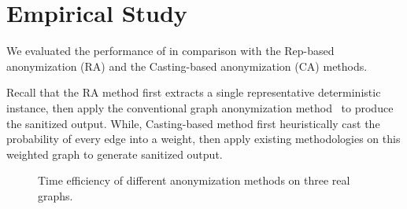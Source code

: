 \section{Empirical Study}
\label{sec:ex}
We evaluated the performance of {\methodName} in comparison with the Rep-based anonymization (RA) and the Casting-based anonymization (CA) methods.

Recall that the RA method first extracts a single representative deterministic instance, then apply the conventional graph anonymization method~\cite{Boldi_Injecting_2012} to produce the sanitized output. While, Casting-based method first heuristically cast the probability of every edge into a weight, then apply existing methodologies\cite{Das_Anonymizing_2010} on this weighted graph to generate sanitized output. 

\begin{figure}[!htb]
    \centering
    \vspace{-5pt}
    \caption{Time efficiency of different anonymization methods on three real graphs.}
    \vspace{-5pt}
    \label{fig:time}
\end{figure} 
